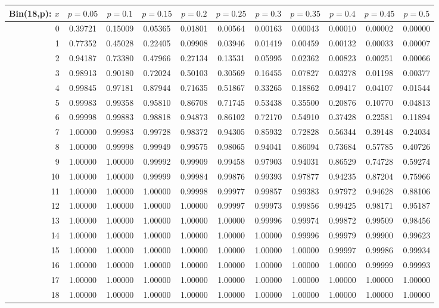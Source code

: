 \documentclass{article}
\begin{document}
{\vspace{8pt minus 6pt}
\begin{tabular}{@{\extracolsep{-2pt}}|r|c|c|c|c|c|c|c|c|c|c|}
\hline
Bin(18,p): $x$
   & $p\!=\!0.05$& $p\!=\!0.1$& $p\!=\!0.15$& $p\!=\!0.2$& $p\!=\!0.25$& $p\!=\!0.3$& $p\!=\!0.35$& $p\!=\!0.4$& $p\!=\!0.45$& $p\!=\!0.5$\\\hline
  0&0.39721&0.15009&0.05365&0.01801&0.00564&0.00163&0.00043&0.00010&0.00002&0.00000\\
  1&0.77352&0.45028&0.22405&0.09908&0.03946&0.01419&0.00459&0.00132&0.00033&0.00007\\
  2&0.94187&0.73380&0.47966&0.27134&0.13531&0.05995&0.02362&0.00823&0.00251&0.00066\\
  3&0.98913&0.90180&0.72024&0.50103&0.30569&0.16455&0.07827&0.03278&0.01198&0.00377\\
  4&0.99845&0.97181&0.87944&0.71635&0.51867&0.33265&0.18862&0.09417&0.04107&0.01544\\
  5&0.99983&0.99358&0.95810&0.86708&0.71745&0.53438&0.35500&0.20876&0.10770&0.04813\\
  6&0.99998&0.99883&0.98818&0.94873&0.86102&0.72170&0.54910&0.37428&0.22581&0.11894\\
  7&1.00000&0.99983&0.99728&0.98372&0.94305&0.85932&0.72828&0.56344&0.39148&0.24034\\
  8&1.00000&0.99998&0.99949&0.99575&0.98065&0.94041&0.86094&0.73684&0.57785&0.40726\\
  9&1.00000&1.00000&0.99992&0.99909&0.99458&0.97903&0.94031&0.86529&0.74728&0.59274\\
 10&1.00000&1.00000&0.99999&0.99984&0.99876&0.99393&0.97877&0.94235&0.87204&0.75966\\
 11&1.00000&1.00000&1.00000&0.99998&0.99977&0.99857&0.99383&0.97972&0.94628&0.88106\\
 12&1.00000&1.00000&1.00000&1.00000&0.99997&0.99973&0.99856&0.99425&0.98171&0.95187\\
 13&1.00000&1.00000&1.00000&1.00000&1.00000&0.99996&0.99974&0.99872&0.99509&0.98456\\
 14&1.00000&1.00000&1.00000&1.00000&1.00000&1.00000&0.99996&0.99979&0.99900&0.99623\\
 15&1.00000&1.00000&1.00000&1.00000&1.00000&1.00000&1.00000&0.99997&0.99986&0.99934\\
 16&1.00000&1.00000&1.00000&1.00000&1.00000&1.00000&1.00000&1.00000&0.99999&0.99993\\
 17&1.00000&1.00000&1.00000&1.00000&1.00000&1.00000&1.00000&1.00000&1.00000&1.00000\\
 18&1.00000&1.00000&1.00000&1.00000&1.00000&1.00000&1.00000&1.00000&1.00000&1.00000\\
\hline
\end{tabular}

}
\end{document}
